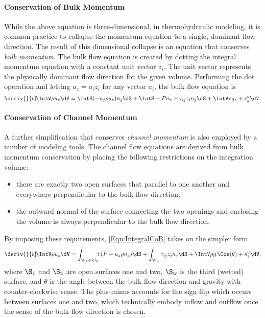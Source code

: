 \paragraph{Conservation of Bulk Momentum}
While the above equation is three-dimensional, in thermohydraulic modeling, it is common practice to collapse the momentum equation to a single, dominant flow direction.
The result of this dimensional collapse is an equation that conserves \textit{bulk momentum}.
The bulk flow equation is created by dotting the integral momentum equation with a constant unit vector $z_i$.
The unit vector represents the physically dominant flow direction for the given volume.
Performing the dot operation and letting $a_z = a_i z_i$ for any vector $a_i$, the bulk flow equation is 
\begin{equation}
    \deriv{}{t}\! \IntV \rho u_z \dV = \IntS (-u_j \rho u_z) n_j \dS + \IntS - P n_z + \tau_{ij} z_i n_j \dS + \IntV \rho g_z + s^u_z \dV.
    \label{Eqn:IntegralCoB}
\end{equation}

\paragraph{Conservation of Channel Momentum}
A further simplification that conserves \textit{channel momentum} is also employed by a number of modeling tools.
The channel flow equations are derived from bulk momentum conservation by placing the following restrictions on the integration volume:
\begin{itemize}
	\item{there are exactly two open surfaces that parallel to one another and everywhere perpendicular to the bulk flow direction;}
	\item{the outward normal of the surface connecting the two openings and enclosing the volume is always perpendicular to the bulk flow direction.}
\end{itemize}
By imposing these requirements, \cref{Eqn:IntegralCoB} takes on the simpler form
\begin{equation}
    \deriv{}{t}\! \IntV \rho u_z \dV =
        \int_{\S_{\text{1}} + \S_{\text{2}}}\mkern-10mu \pm(P + u_z \rho u_z)\dS + 
        \int_{\S_{\text{w}}} \tau_{ij} z_i n_j \dS + \IntV \rho g\,\Cos(\theta) + s^u_z \dV,
    \label{Eqn:IntegralCoCF}
\end{equation}
where $\S_{\text{1}}$ and $\S_{\text{2}}$ are open surfaces one and two, $\S_{\text{w}}$ is the third (wetted) surface, and $\theta$ is the angle between the bulk flow direction and gravity with counter-clockwise sense.
The plus-minus accounts for the sign flip which occurs between surfaces one and two, which technically embody inflow and outflow once the sense of the bulk flow direction is chosen.





